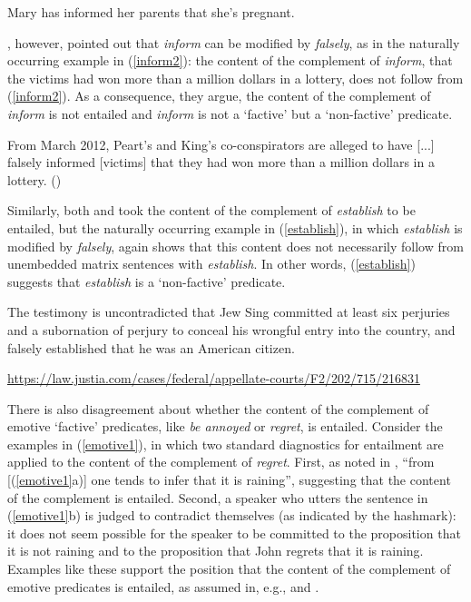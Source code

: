\documentclass[11pt,fleqn]{article}
\newcommand{\6}{\mbox{$[\hspace*{-.6mm}[$}}
\newcommand{\9}{\mbox{$]\hspace*{-.6mm}]$}}
\begin{document}
\begin{exe}
\ex\label{inform} Mary has informed her parents that she's pregnant.

\end{exe}
\citet[76]{anand-hacquard2014}, however, pointed out that {\em inform} can be modified by {\em falsely}, as in the naturally occurring example in (\ref{inform2}): the content of the complement of {\em inform}, that the victims had won more than a million dollars in a lottery, does not follow from (\ref{inform2}). As a consequence, they argue, the content of the complement of {\em inform}  is not entailed and {\em inform} is not a `factive' but a `non-factive' predicate.

\begin{exe}
\ex\label{inform2} From March 2012, Peart's and King's co-conspirators are alleged to have [...] falsely informed [victims] that they had won more than a million dollars in a lottery. \hfill (\citealt[76]{anand-hacquard2014})
\end{exe}
Similarly, both \citet{wyse} and \citet{swanson2012} took the content of the complement of {\em establish} to be entailed, but the naturally occurring example in (\ref{establish}), in which {\em establish} is  modified by {\em falsely}, again shows that this content does not necessarily follow from unembedded matrix sentences with {\em establish}. In other words, (\ref{establish}) suggests that {\em establish} is a `non-factive' predicate.

\begin{exe}
\ex\label{establish} The testimony is uncontradicted that Jew Sing committed at least six perjuries and a subornation of perjury to conceal his wrongful entry into the country, and falsely established that he was an American citizen. \hfill \begin{footnotesize}\url{https://law.justia.com/cases/federal/appellate-courts/F2/202/715/216831}\end{footnotesize}
\end{exe}

There is also disagreement about whether the content of the complement of emotive `factive' predicates, like {\em be annoyed} or {\em regret}, is entailed. Consider the examples in (\ref{emotive1}), in which two standard diagnostics for entailment are applied to the content of the complement of {\em regret}. First, as noted in \citealt[514]{abrusan2011}, ``from [(\ref{emotive1}a)] one tends to infer that it is raining'', suggesting that the content of the complement is entailed. Second, a speaker who utters the sentence in (\ref{emotive1}b) is judged to contradict themselves (as indicated by the hashmark): it does not seem possible for the speaker to be committed to the proposition that it is not raining and to the proposition that John regrets that it is raining. Examples like these support the position that the content of the  complement of emotive predicates is entailed, as assumed in, e.g., \citealt{gazdar79a,abrusan2011} and \citealt{anand-hacquard2014}.
\end{document}
